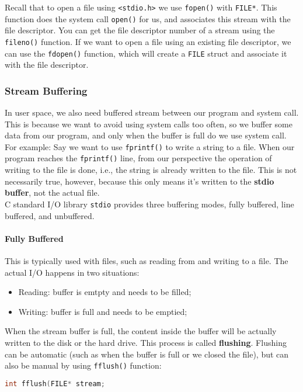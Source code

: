 \documentclass{article}
\newcommand{\bold}[1]{\textbf{#1}}
\renewcommand{\b}{\item[$\circ$]}
\newcommand{\newlist}{\begin{itemize}}
\renewcommand{\endlist}{\end{itemize}}
\newcommand{\code}[1]{\texttt{#1}}
\begin{document}
\noindent Recall that to open a file using \code{<stdio.h>} we use \code{fopen()} with \code{FILE*}. This function does the system call \code{open()} for us, and associates this stream with the file descriptor. You can get the file descriptor number of a stream using the \code{fileno()} function. If we want to open a file using an existing file descriptor, we can use the \code{fdopen()} function, which will create a \code{FILE} struct and associate it with the file descriptor. 

\subsubsection{Stream Buffering}

In user space, we also need buffered stream between our program and system call. This is because we want to avoid using system calls too often, so we buffer some data from our program, and only when the buffer is full do we use system call. For example: Say we want to use \code{fprintf()} to write a string to a file. When our program reaches the \code{fprintf()} line, from our perspective the operation of writing to the file is done, i.e., the string is already written to the file. This is not necessarily true, however, because this only means it's written to the \bold{stdio buffer}, not the actual file. \\

\noindent C standard I/O library \code{stdio} provides three buffering modes, fully buffered, line buffered, and unbuffered. \\

\paragraph{Fully Buffered}

This is typically used with files, such as reading from and writing to a file. The actual I/O happens in two situations: 

\newlist
\b Reading: buffer is emtpty and needs to be filled;
\b Writing: buffer is full and needs to be emptied;
\endlist

\noindent When the stream buffer is full, the content inside the buffer will be actually written to the disk or the hard drive. This process is called \bold{flushing}. Flushing can be automatic (such as when the buffer is full or we closed the file), but can also be manual by using \code{fflush()} function:

\begin{lstlisting}[language=C]
int fflush(FILE* stream;
\end{lstlisting}
\end{document}
